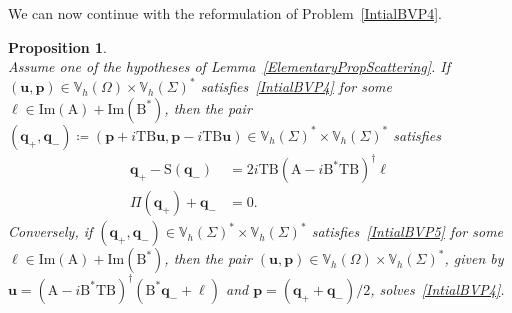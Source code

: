 \documentclass[a4paper,11pt]{article}
\newcommand{\mrm}{\mathrm}
\newcommand{\mA}{\mathrm{A}}
\newcommand{\mB}{\mathrm{B}}
\newcommand{\mT}{\mathrm{T}}
\newcommand{\mS}{\mathrm{S}}
\newcommand{\mbV}{\mathbb{V}}
\newcommand{\bell}{\boldsymbol{\ell}}
\newcommand{\bp}{\boldsymbol{p}}
\newcommand{\bu}{\boldsymbol{u}}
\newcommand{\bq}{\boldsymbol{q}}
\newtheorem{prop}[defn]{Proposition}
\begin{document}
We can now continue with the reformulation of Problem~\eqref{IntialBVP4}.

\begin{prop}\label{SkeletonFormulation1}\quad\\
  Assume one of the hypotheses of Lemma~\ref{ElementaryPropScattering}. If $(\bu,\bp)\in
  \mbV_h(\Omega)\times\mbV_h(\Sigma)^*$ satisfies~\eqref{IntialBVP4}
  for some $\bell \in\mrm{Im}(\mA)+\mrm{Im}(\mB^*)$, then the pair
  $(\bq_+,\bq_-) \coloneq (\bp+i\mT\mB\bu,\bp-i\mT\mB\bu )\in
  \mbV_h(\Sigma)^*\times \mbV_h(\Sigma)^*$ satisfies
  \begin{equation}\label{IntialBVP5}
    \begin{aligned}
      \bq_+-\mS(\bq_-) & = 2i\mT\mB(\mA-i\mB^*\mT\mB)^{\dagger}\bell\\
      \Pi(\bq_+)+\bq_- & = 0.
    \end{aligned}
  \end{equation}
  Conversely, if $(\bq_+,\bq_-)\in \mbV_h(\Sigma)^*\times
  \mbV_h(\Sigma)^*$ satisfies~\eqref{IntialBVP5} for some $\bell\in
  \mrm{Im}(\mA)+\mrm{Im}(\mB^*)$, then the pair $(\bu,\bp)\in
  \mbV_h(\Omega)\times\mbV_h(\Sigma)^{*}$, given by $\bu =
  (\mA-i\mB^*\mT\mB)^{\dagger}(\mB^*\bq_-+\bell)$ and $\bp =
  (\bq_++\bq_-)/2$, solves~\eqref{IntialBVP4}.
\end{prop}
\end{document}
